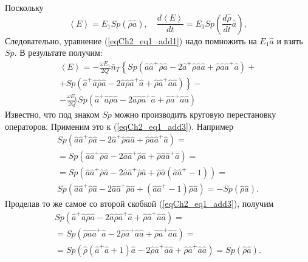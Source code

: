 Поскольку 
\begin{equation}
\left<E\right> = E_1 Sp\left(\hat{\rho}\hat{a}\right), \quad
\frac{d \left<E\right>}{d t} = E_1 Sp\left(\frac{d \hat{\rho}}{dt}\hat{a}\right),
\label{eqCh2_eq1_add2}
\end{equation}
Следовательно, уравнение (\ref{eqCh2_eq1_add1}) 
надо помножить на $E_1 \hat{a}$ и взять $Sp$. В результате получим:
\begin{eqnarray}
\dot{\left<E\right>} =
- \frac{\omega E_1}{2Q}\bar{n}_T
\left\{Sp\left(\hat{a}\hat{a}^{+}\hat{\rho}\hat{a} - 
2 \hat{a}^{+}\hat{\rho}\hat{a}\hat{a} +
\hat{\rho}\hat{a}\hat{a}^{+}\hat{a}\right) + 
\right.
\nonumber \\
+\left.
Sp\left(\hat{a}^{+}\hat{a}\hat{\rho}\hat{a} - 
2 \hat{a}\hat{\rho}\hat{a}^{+}\hat{a}
+ \hat{\rho}\hat{a}^{+}\hat{a}\hat{a}
\right)
\right\}
- 
\nonumber \\
- \frac{\omega E_1}{2Q}
Sp\left(\hat{a}^{+}\hat{a}\hat{\rho}\hat{a} - 
2 \hat{a}\hat{\rho}\hat{a}^{+}\hat{a}
+ \hat{\rho}\hat{a}^{+}\hat{a}\hat{a}
\right)
\label{eqCh2_eq1_add3}
\end{eqnarray}
Известно, что под знаком $Sp$ можно производить круговую перестановку
операторов. Применим это к (\ref{eqCh2_eq1_add3}).
Например
\begin{eqnarray}
Sp\left(\hat{a}\hat{a}^{+}\hat{\rho}\hat{a} - 
2 \hat{a}^{+}\hat{\rho}\hat{a}\hat{a} +
\hat{\rho}\hat{a}\hat{a}^{+}\hat{a}\right) = 
\nonumber \\
= Sp\left(\hat{a}\hat{a}^{+}\hat{\rho}\hat{a} - 
2 \hat{a}\hat{a}^{+}\hat{\rho}\hat{a} +
\hat{\rho}\hat{a}\hat{a}^{+}\hat{a}\right) = 
\nonumber \\
= Sp\left(\hat{a}\hat{a}^{+}\hat{\rho}\hat{a} - 
2 \hat{a}\hat{a}^{+}\hat{\rho}\hat{a} +
\hat{\rho}\hat{a}\left(\hat{a}\hat{a}^{+} - 1\right)\right) = 
\nonumber \\
Sp\left(\hat{a}\hat{a}^{+}\hat{\rho}\hat{a} - 
2 \hat{a}\hat{a}^{+}\hat{\rho}\hat{a} +
\left(\hat{a}\hat{a}^{+} - 1\right)\hat{\rho}\hat{a}\right) = 
- Sp\left(\hat{\rho}\hat{a}\right).
\label{eqCh2_eq1_add4}
\end{eqnarray}
Проделав то же самое со второй скобкой (\ref{eqCh2_eq1_add3}), получим
\begin{eqnarray}
Sp\left(\hat{a}^{+}\hat{a}\hat{\rho}\hat{a} - 
2 \hat{a}\hat{\rho}\hat{a}^{+}\hat{a}
+ \hat{\rho}\hat{a}^{+}\hat{a}\hat{a} \right) = 
\nonumber \\
= 
Sp\left(\hat{\rho}\hat{a}\hat{a}^{+}\hat{a} - 
2 \hat{\rho}\hat{a}^{+}\hat{a}\hat{a}
+ \hat{\rho}\hat{a}^{+}\hat{a}\hat{a} \right) = 
\nonumber \\
= 
Sp\left(\hat{\rho}\left(\hat{a}^{+}\hat{a} + 1\right)\hat{a} - 
2 \hat{\rho}\hat{a}^{+}\hat{a}\hat{a}
+ \hat{\rho}\hat{a}^{+}\hat{a}\hat{a} \right) = 
Sp\left(\hat{\rho}\hat{a}\right).
\label{eqCh2_eq1_add5}
\end{eqnarray}
